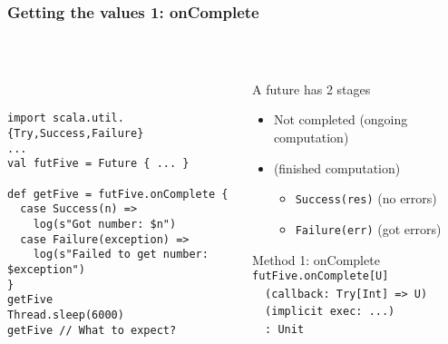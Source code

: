 \documentclass[aspectratio=169]{beamer}
\begin{document}
\begin{frame}[fragile]\frametitle{Getting the values 1: onComplete}
~\\[-8mm]
\begin{columns}
\begin{column}{0.56\textwidth}
~\\
\begin{lstlisting}[emph={execute,sleep,log,Future,Try,Success,Failure,onComplete}]
import scala.util.{Try,Success,Failure}
...
val futFive = Future { ... }

def getFive = futFive.onComplete {
  case Success(n) =>
    log(s"Got number: $n")
  case Failure(exception) =>
    log(s"Failed to get number: $exception")
}
getFive
Thread.sleep(6000)
getFive // What to expect?
\end{lstlisting}
\end{column}
\begin{column}{0.46\textwidth}
\begin{block}{A future has 2 stages}
\begin{itemize}
  \item \alert{Not completed} (ongoing computation)
  \item {} (finished computation)
  \begin{itemize}
    \item \texttt{Success(res)} (no errors)
    \item \texttt{Failure(err)} (got errors)
  \end{itemize}
\end{itemize}
\end{block}
\begin{alertblock}{Method 1: onComplete}\small
  \texttt{futFive.onComplete[U]}
  \\~~\texttt{(callback: Try[Int] => U)}
  \\~~\texttt{(implicit exec: ...)}
  \\~~\texttt{: Unit}
\end{alertblock}

\end{column}
\end{columns}
\end{frame}
\end{document}
